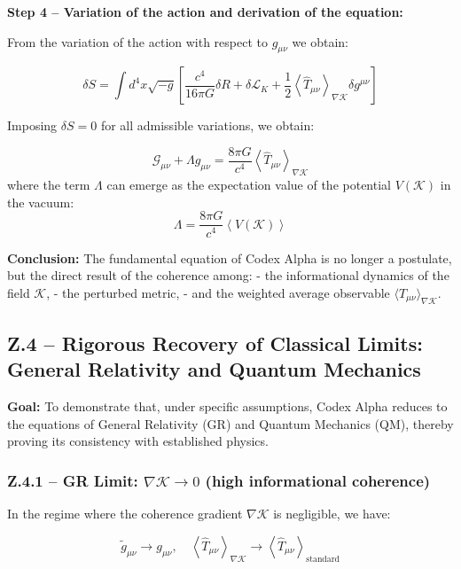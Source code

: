 \documentclass[12pt]{article}
\begin{document}
\vspace{0.5em}
\textbf{Step 4 – Variation of the action and derivation of the equation:}

From the variation of the action with respect to $g_{\mu\nu}$ we obtain:

\[
\delta S = \int d^4x \sqrt{-g} \left[ \frac{c^4}{16\pi G} \delta R + \delta \mathcal{L}_{K} + \frac{1}{2} \left\langle \hat{T}_{\mu\nu} \right\rangle_{\nabla \mathcal{K}} \delta g^{\mu\nu} \right]
\]

Imposing $\delta S = 0$ for all admissible variations, we obtain:

\[
\mathcal{G}_{\mu\nu} + \Lambda g_{\mu\nu} = \frac{8\pi G}{c^4} \left\langle \hat{T}_{\mu\nu} \right\rangle_{\nabla \mathcal{K}}
\]
where the term $\Lambda$ can emerge as the expectation value of the potential $V(\mathcal{K})$ in the vacuum:
\[
\Lambda = \frac{8\pi G}{c^4} \left\langle V(\mathcal{K}) \right\rangle
\]

\vspace{0.5em}
\textbf{Conclusion:}  
The fundamental equation of Codex Alpha is no longer a postulate, but the direct result of the coherence among:
- the informational dynamics of the field $\mathcal{K}$,
- the perturbed metric,
- and the weighted average observable $\langle \hat{T}_{\mu\nu} \rangle_{\nabla \mathcal{K}}$.

\subsection*{Z.4 – Rigorous Recovery of Classical Limits: General Relativity and Quantum Mechanics}

\textbf{Goal:} To demonstrate that, under specific assumptions, Codex Alpha reduces to the equations of General Relativity (GR) and Quantum Mechanics (QM), thereby proving its consistency with established physics.

\subsubsection*{Z.4.1 – GR Limit: $\nabla \mathcal{K} \to 0$ (high informational coherence)}

In the regime where the coherence gradient $\nabla \mathcal{K}$ is negligible, we have:

\[
\tilde{g}_{\mu\nu} \to g_{\mu\nu}, \quad \left\langle \hat{T}_{\mu\nu} \right\rangle_{\nabla \mathcal{K}} \to \left\langle \hat{T}_{\mu\nu} \right\rangle_{\text{standard}}
\]
\end{document}
